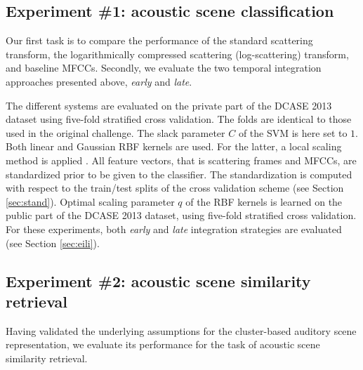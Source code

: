 \documentclass[journal]{IEEEtran}
\newcommand{\ja}[1]{\textcolor{magenta}{Joakim : #1}}
\begin{document}


\subsection{Experiment \#1: acoustic scene classification}

Our first task is to compare the performance of the standard scattering transform, the logarithmically compressed scattering (log-scattering) transform, and baseline MFCCs. Secondly, we evaluate the two temporal integration approaches presented above, \emph{early} and \emph{late}.

The different systems are evaluated on the private part of the DCASE 2013 dataset using five-fold stratified cross validation. The folds are identical to those used in the original challenge. The slack parameter $C$ of the SVM is here set to $1$. Both linear and Gaussian RBF kernels are used. For the latter, a local scaling method is applied \cite{selfTuneManor2004}. All feature vectors, that is scattering frames and MFCCs, are standardized prior to be given to the classifier. The standardization is computed with respect to the train/test splits of the cross validation scheme (see Section \ref{sec:stand}). Optimal scaling parameter $q$ of the RBF kernels is  learned on the public part of the DCASE 2013 dataset, using five-fold stratified cross validation.  For these experiments, both \emph{early} and \emph{late} integration strategies are evaluated (see Section \ref{sec:eili}).

\subsection{Experiment \#2: acoustic scene similarity retrieval}

Having validated the underlying assumptions for the cluster-based auditory scene representation, we evaluate its performance for the task of acoustic scene similarity retrieval.
\end{document}
